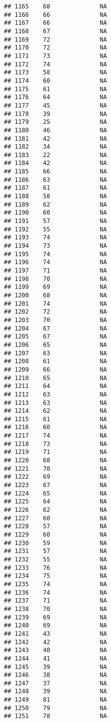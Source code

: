 \documentclass[]{article}
\begin{document}
\begin{verbatim}
## 1165    68              NA
## 1166    66              NA
## 1167    66              NA
## 1168    67              NA
## 1169    72              NA
## 1170    72              NA
## 1171    73              NA
## 1172    74              NA
## 1173    58              NA
## 1174    60              NA
## 1175    61              NA
## 1176    64              NA
## 1177    45              NA
## 1178    39              NA
## 1179    25              NA
## 1180    46              NA
## 1181    42              NA
## 1182    34              NA
## 1183    22              NA
## 1184    42              NA
## 1185    66              NA
## 1186    63              NA
## 1187    61              NA
## 1188    58              NA
## 1189    62              NA
## 1190    60              NA
## 1191    57              NA
## 1192    55              NA
## 1193    74              NA
## 1194    73              NA
## 1195    74              NA
## 1196    74              NA
## 1197    71              NA
## 1198    70              NA
## 1199    69              NA
## 1200    68              NA
## 1201    74              NA
## 1202    72              NA
## 1203    70              NA
## 1204    67              NA
## 1205    67              NA
## 1206    65              NA
## 1207    63              NA
## 1208    61              NA
## 1209    66              NA
## 1210    65              NA
## 1211    64              NA
## 1212    63              NA
## 1213    63              NA
## 1214    62              NA
## 1215    61              NA
## 1216    60              NA
## 1217    74              NA
## 1218    73              NA
## 1219    71              NA
## 1220    68              NA
## 1221    70              NA
## 1222    69              NA
## 1223    67              NA
## 1224    65              NA
## 1225    64              NA
## 1226    62              NA
## 1227    60              NA
## 1228    57              NA
## 1229    60              NA
## 1230    59              NA
## 1231    57              NA
## 1232    55              NA
## 1233    76              NA
## 1234    75              NA
## 1235    74              NA
## 1236    74              NA
## 1237    71              NA
## 1238    70              NA
## 1239    69              NA
## 1240    69              NA
## 1241    43              NA
## 1242    42              NA
## 1243    40              NA
## 1244    41              NA
## 1245    39              NA
## 1246    38              NA
## 1247    37              NA
## 1248    39              NA
## 1249    81              NA
## 1250    79              NA
## 1251    78              NA

\end{verbatim}
\end{document}
